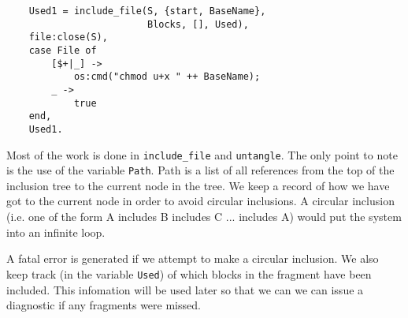 \begin{flushleft}
\verb&    Used1 = include_file(S, {start, BaseName}, &\\
\noindent{}%
\verb&                         Blocks, [], Used),&\\
\noindent{}%
\verb&    file:close(S),&\\
\noindent{}%
\verb&    case File of&\\
\noindent{}%
\verb&        [$+|_] ->&\\
\noindent{}%
\verb&            os:cmd("chmod u+x " ++ BaseName);&\\
\noindent{}%
\verb&        _ ->&\\
\noindent{}%
\verb&            true&\\
\noindent{}%
\verb&    end,&\\
\noindent{}%
\verb&    Used1.&\\
\end{flushleft}

    Most  of    the   work  is    done    in  \verb+include_file+  and
\verb+untangle+. The  only point to  note  is the  use of the variable
\verb+Path+.  Path is a list  of all references  from  the top of  the
inclusion  tree to the current node  in the tree.  We keep a record of
how  we have got  to   the current node   in  order to  avoid  circular
inclusions. A circular  inclusion  (i.e. one of  the form  A includes B
includes C ... includes A) would put the system into an infinite loop.

  A  fatal  error is  generated   if we attempt   to  make a  circular
inclusion.  We also keep track (in  the variable \verb+Used+) of which
blocks in  the fragment have been included.    This infomation will be
used later so that we can we  can issue a  diagnostic if any fragments
were missed.

